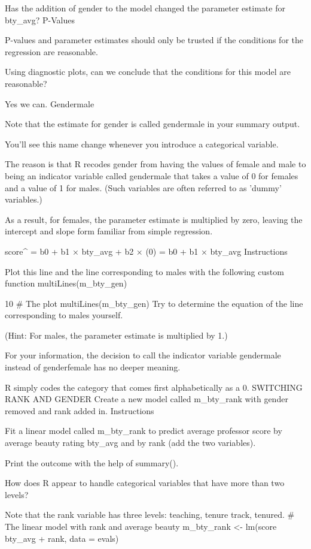 Has the addition of gender to the model changed the parameter estimate for bty_avg?
P-Values

P-values and parameter estimates should only be trusted if the conditions for the 
regression are reasonable. 

Using diagnostic plots, can we conclude that the conditions for this model are reasonable?

Yes we can.
Gendermale

Note that the estimate for gender is called gendermale in your summary output. 

You'll see this name change whenever you introduce a categorical variable. 

The reason is that R recodes gender from having the values of female and male to 
being an indicator variable called gendermale that takes a value of 0 for females 
and a value of 1 for males. 
(Such variables are often referred to as 'dummy' variables.)

As a result, for females, the parameter estimate is multiplied by zero, leaving the
intercept and slope form familiar from simple regression.

score^ = b0 + b1 × bty_avg + b2 × (0)
       = b0 + b1 × bty_avg
Instructions

Plot this line and the line corresponding to males with the following custom function
multiLines(m_bty_gen)

10
# The plot
multiLines(m_bty_gen)
Try to determine the equation of the line corresponding to males yourself.

(Hint: For males, the parameter estimate is multiplied by 1.)

For your information, the decision to call the indicator variable gendermale instead
of genderfemale has no deeper meaning. 

R simply codes the category that comes first alphabetically as a 0.
SWITCHING RANK AND GENDER
Create a new model called m_bty_rank with gender removed and rank added in.
Instructions

Fit a linear model called m_bty_rank to predict average professor score by average 
beauty rating bty_avg and by rank (add the two variables).

Print the outcome with the help of summary().

How does R appear to handle categorical variables that have more than two levels? 

Note that the rank variable has three levels: teaching, tenure track, tenured.
# The linear model with rank and average beauty
m_bty_rank <- lm(score ~ bty_avg + rank, data = evals)

